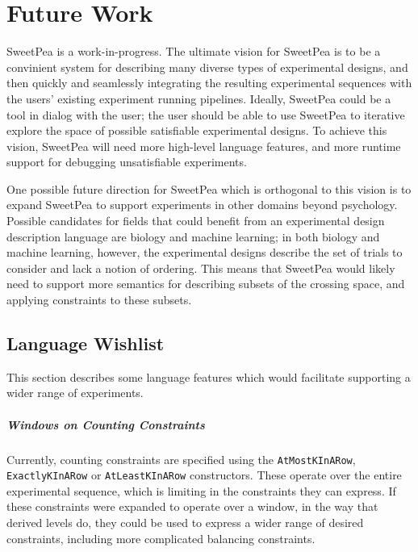 \chapter{Future Work}

SweetPea is a work-in-progress. The ultimate vision for SweetPea is to be a convinient system for describing many diverse types of experimental designs, and then quickly and seamlessly integrating the resulting experimental sequences with the users' existing experiment running pipelines. Ideally, SweetPea could be a tool in dialog with the user; the user should be able to use SweetPea to iterative explore the space of possible satisfiable experimental designs. To achieve this vision, SweetPea will need more high-level language features, and more runtime support for debugging unsatisfiable experiments.

One possible future direction for SweetPea which is orthogonal to this vision is to expand SweetPea to support experiments in other domains beyond psychology. Possible candidates for fields that could benefit from an experimental design description language are biology and machine learning; in both biology and machine learning, however, the experimental designs describe the set of trials to consider and lack a notion of ordering. This means that SweetPea would likely need to support more semantics for describing subsets of the crossing space, and applying constraints to these subsets.

\section{Language Wishlist}

This section describes some language features which would facilitate supporting a wider range of experiments.

\paragraph*{Windows on Counting Constraints}
Currently, counting constraints are specified using the \texttt{AtMostKInARow}, \texttt{ExactlyKInARow} or \texttt{AtLeastKInARow} constructors. These operate over the entire experimental sequence, which is limiting in the constraints they can express. If these constraints were expanded to operate over a window, in the way that derived levels do, they could be used to express a wider range of desired constraints, including more complicated balancing constraints.

